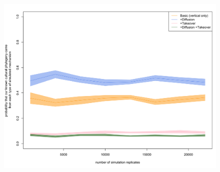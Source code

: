 \documentclass[]{book}
\theoremstyle{definition}
\theoremstyle{definition}
\theoremstyle{remark}
\begin{document}
\begin{figure}
\centering
\includegraphics{Prob_aus.png}
\caption{}
\end{figure}
\end{document}
